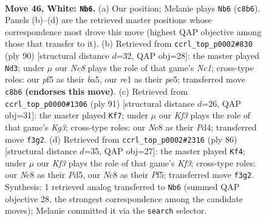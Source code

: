 \documentclass[11pt]{article}
\begin{document}
\clearpage

\begin{figure}[p]\centering
\begin{subfigure}{0.46\textwidth}\centering
\resizebox{\linewidth}{!}{%
\newchessgame
\chessboard[
  setfen={2N5/1p4bk/6p1/5p1p/P1r5/R4KPP/5P2/4r3 w - - 7 46},
  showmover=false,
  pgfstyle=straightmove, color=movearrow, markmove={c8-b6}
]}
\caption{}
\end{subfigure}\hfill
\begin{subfigure}{0.46\textwidth}\centering
\resizebox{\linewidth}{!}{%
\newchessgame
\chessboard[
  setfen={8/5kp1/p5p1/bp2p1P1/2r1P2P/5K2/1P3P2/1RN5 w - - 0 46},
  showmover=false,
  pgfstyle=straightmove, color=movearrow, markmove={c1-d3}
]}
\caption{}
\end{subfigure}
\\[4pt]
\begin{subfigure}{0.46\textwidth}\centering
\resizebox{\linewidth}{!}{%
\newchessgame
\chessboard[
  setfen={8/6p1/2r3kp/2pR4/3p1P1P/1P4P1/6K1/8 b - - 0 46},
  showmover=false,
  pgfstyle=straightmove, color=movearrow, markmove={g6-f7}
]}
\caption{}
\end{subfigure}\hfill
\begin{subfigure}{0.46\textwidth}\centering
\resizebox{\linewidth}{!}{%
\newchessgame
\chessboard[
  setfen={8/3k1pp1/p2p4/3PrP2/P5Pp/3R1K2/7P/8 w - - 0 44},
  showmover=false,
  pgfstyle=straightmove, color=movearrow, markmove={f3-f4}
]}
\caption{}
\end{subfigure}
\caption{\textbf{Move 46, White: \texttt{Nb6}.} (a) Our position; Melanie plays \texttt{Nb6} (\texttt{c8b6}). Panels (b)--(d) are the retrieved master positions whose correspondence most drove this move (highest QAP objective among those that transfer to it). (b) Retrieved from \texttt{ccrl\_top\_p0002\#830} (ply 90) [structural distance $d$=32, QAP obj=28]: the master played \texttt{Nd3}; under $\mu$ our \emph{Nc8} plays the role of that game's \emph{Nc1}; cross-type roles: our \emph{p}f5 as their \emph{b}a5, our \emph{r}e1 as their \emph{p}e5; transferred move \texttt{c8b6} \textbf{(endorses this move)}. (c) Retrieved from \texttt{ccrl\_top\_p0000\#1306} (ply 91) [structural distance $d$=26, QAP obj=31]: the master played \texttt{Kf7}; under $\mu$ our \emph{Kf3} plays the role of that game's \emph{Kg3}; cross-type roles: our \emph{N}c8 as their \emph{P}d4; transferred move \texttt{f3g2}. (d) Retrieved from \texttt{ccrl\_top\_p0002\#2316} (ply 86) [structural distance $d$=35, QAP obj=27]: the master played \texttt{Kf4}; under $\mu$ our \emph{Kf3} plays the role of that game's \emph{Kf3}; cross-type roles: our \emph{N}c8 as their \emph{P}d5, our \emph{N}c8 as their \emph{P}f5; transferred move \texttt{f3g2}. Synthesis: 1 retrieved analog transferred to \texttt{Nb6} (summed QAP objective 28, the strongest correspondence among the candidate moves); Melanie committed it via the \texttt{search} selector.}
\label{fig:thought-m90}
\end{figure}
\end{document}
